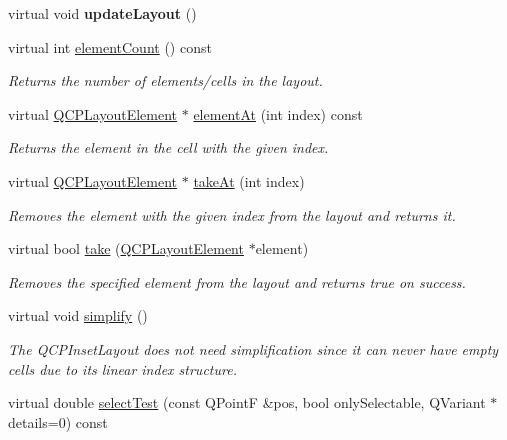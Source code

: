 \begin{DoxyCompactItemize}
\hypertarget{classQCPLayoutInset_a7b33fdd51b18e6db7cea9bfb2d263b4a}{}virtual void {\bfseries update\+Layout} ()\label{classQCPLayoutInset_a7b33fdd51b18e6db7cea9bfb2d263b4a}

\item 
virtual int \hyperlink{classQCPLayoutInset_a2087b97b9266fd9e0f571a8d3cf709f9}{element\+Count} () const 
\begin{DoxyCompactList}\small\item\em Returns the number of elements/cells in the layout. \end{DoxyCompactList}\item 
virtual \hyperlink{classQCPLayoutElement}{Q\+C\+P\+Layout\+Element} $\ast$ \hyperlink{classQCPLayoutInset_ab096d07b08f9b5455647f3ba7ff60e27}{element\+At} (int index) const 
\begin{DoxyCompactList}\small\item\em Returns the element in the cell with the given {\itshape index}. \end{DoxyCompactList}\item 
virtual \hyperlink{classQCPLayoutElement}{Q\+C\+P\+Layout\+Element} $\ast$ \hyperlink{classQCPLayoutInset_ad6756a3b507e20496aaf7f5ca16c47d1}{take\+At} (int index)
\begin{DoxyCompactList}\small\item\em Removes the element with the given {\itshape index} from the layout and returns it. \end{DoxyCompactList}\item 
virtual bool \hyperlink{classQCPLayoutInset_a9ac707ccff650633b97f52dd5cddcf49}{take} (\hyperlink{classQCPLayoutElement}{Q\+C\+P\+Layout\+Element} $\ast$element)
\begin{DoxyCompactList}\small\item\em Removes the specified {\itshape element} from the layout and returns true on success. \end{DoxyCompactList}\item 
virtual void \hyperlink{classQCPLayoutInset_abb9eb23bf2d7c587a8abe02d065eae0a}{simplify} ()
\begin{DoxyCompactList}\small\item\em The Q\+C\+P\+Inset\+Layout does not need simplification since it can never have empty cells due to its linear index structure. \end{DoxyCompactList}\item 
virtual double \hyperlink{classQCPLayoutInset_ab5a2f2b88c05e369fd7da9583d17aa3a}{select\+Test} (const Q\+Point\+F \&pos, bool only\+Selectable, Q\+Variant $\ast$details=0) const 

\end{DoxyCompactItemize}
